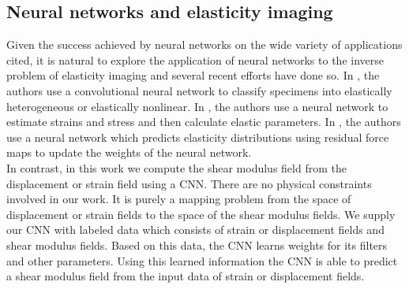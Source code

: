 \documentclass[12pt]{article}
\begin{document}
\subsection{Neural networks and elasticity imaging}
Given the success achieved by neural networks on the wide variety of applications cited, it is natural to explore the application of neural networks to the inverse problem of elasticity imaging and several recent efforts \cite{paper:pateloberai2019,misc:gu2020,paper:hoeriginsana2016} have done so. In \cite{paper:pateloberai2019}, the authors use a convolutional neural network to classify specimens into elastically heterogeneous or elastically nonlinear. In \cite{paper:hoeriginsana2016}, the authors use a neural network to estimate strains and stress and then calculate elastic parameters. In \cite{misc:gu2020}, the authors use a neural network which predicts elasticity distributions using residual force maps to update the weights of the neural network. \\In contrast, in this work we compute the shear modulus field from the displacement or strain field using a CNN. There are no physical constraints involved in our work. It is purely a mapping problem from the space of displacement or strain fields to the space of the shear modulus fields. We supply our CNN with labeled data which consists of strain or displacement fields and shear modulus fields. Based on this data, the CNN learns weights for its filters and other parameters. Using this learned information the CNN is able to predict a shear modulus field from the input data of strain or displacement fields.
%
\end{document}
